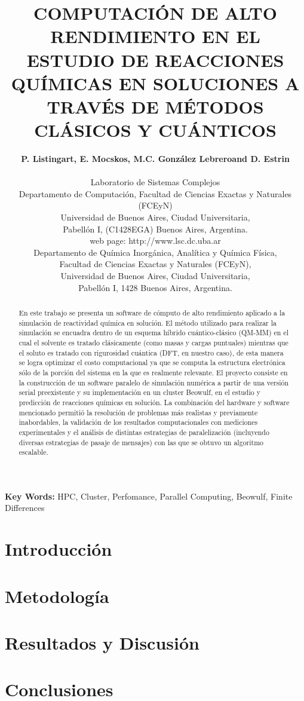 \documentclass[oneside,a4paper]{mecom}
\title{COMPUTACI\'ON DE ALTO RENDIMIENTO EN EL ESTUDIO DE REACCIONES QU\'IMICAS EN SOLUCIONES A TRAV\'ES DE M\'ETODOS CL\'ASICOS Y CU\'ANTICOS}
\author{
\textbf{P. Listingart\stared, E. Mocskos\stared, M.C. Gonz\'alez Lebrero\dagged and D. Estrin\dagged}\\
\\
\stared Laboratorio de Sistemas Complejos\\
Departamento de Computaci\'on, Facultad de Ciencias Exactas y Naturales (FCEyN)\\
Universidad de Buenos Aires, Ciudad Universitaria, \\
Pabell\'on I, (C1428EGA) Buenos Aires, Argentina.\\
web page: http://www.lsc.dc.uba.ar\\
\dagged Departamento de Qu\'imica Inorg\'anica, Anal\'itica y Qu\'imica F\'isica, \\
Facultad de Ciencias Exactas y Naturales (FCEyN), \\
Universidad de Buenos Aires, Ciudad Universitaria, \\
Pabell\'on I, 1428 Buenos Aires, Argentina.
}
\begin{document}
\vspace{3cm}
\maketitle
\noindent\textbf{Key Words:} HPC, Cluster, Perfomance, Parallel Computing, Beowulf, Finite Differences
\vspace{12pt}

\begin{abstract}
En este trabajo se presenta un software de c\'omputo de alto rendimiento aplicado a la simulaci\'on de reactividad qu\'imica en soluci\'on. El m\'etodo utilizado para realizar la simulaci\'on se encuadra dentro de un esquema h\'ibrido cu\'antico-cl\'asico (QM-MM) en el cual el solvente es tratado cl\'asicamente (como masas y cargas puntuales) mientras que el soluto es tratado con rigurosidad cu\'antica (DFT, en nuestro caso), de esta manera se logra optimizar el costo computacional ya que se computa la estructura electr\'onica s\'olo de la porci\'on del sistema en la que es realmente relevante. El proyecto consiste en la construcci\'on de un software paralelo de simulaci\'on num\'erica a partir de una versi\'on serial preexistente y su implementaci\'on en un cluster Beowulf, en el estudio y predicci\'on de reacciones qu\'imicas en soluci\'on. La combinaci\'on del hardware y software mencionado permiti\'o la resoluci\'on de problemas m\'as realistas y previamente inabordables, la validaci\'on de los resultados computacionales con mediciones experimentales y el an\'alisis de distintas estrategias de paralelizaci\'on (incluyendo diversas estrategias de pasaje de mensajes) con las que se obtuvo un algoritmo escalable.
\end{abstract}

\section{Introducci\'on}

\section{Metodolog\'ia}

\section{Resultados y Discusi\'on}

\section{Conclusiones}
\end{document}
